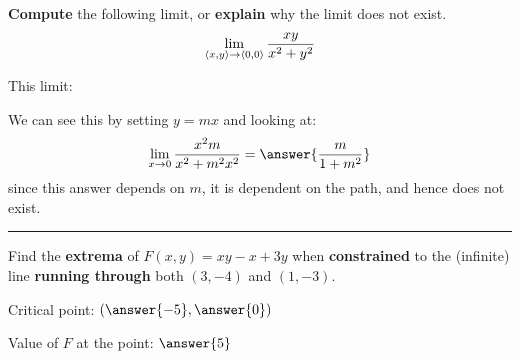 \documentclass{ximera}
\begin{document}
\begin{problem} \textbf{Compute} the following limit, or \textbf{explain} why the limit does not exist.
  \[
  \lim_{\left\langle x,y\right\rangle\to \left\langle 0,0\right\rangle} \frac{x y}{x^2+y^2}
  \]
  \begin{prompt}
    This limit:
    \begin{multipleChoice}
    \end{multipleChoice}
    \begin{problem}
      We can see this by setting $y=mx$ and looking at:
      \[
      \lim_{x\to 0} \frac{x^2 m }{x^2+m^2x^2} = \answer{\frac{m}{1+m^2}}
      \]
      since this answer depends on $m$, it is dependent on the path,
      and hence does not exist.
    \end{problem}
  \end{prompt}
  \vfill
\end{problem}



\hrule

\begin{problem}
  Find the \textbf{extrema} of $F(x,y) = x y- x+ 3y $ when \textbf{constrained} to the
  (infinite) line \textbf{running through} both $(3,-4)$ and $(1,-3)$.
  \begin{prompt}
    Critical point: $\left(\answer{-5},\answer{0}\right)$

    Value of $F$ at the point: $\answer{5}$
  \end{prompt}

  \vfill
\end{problem}
\end{document}
